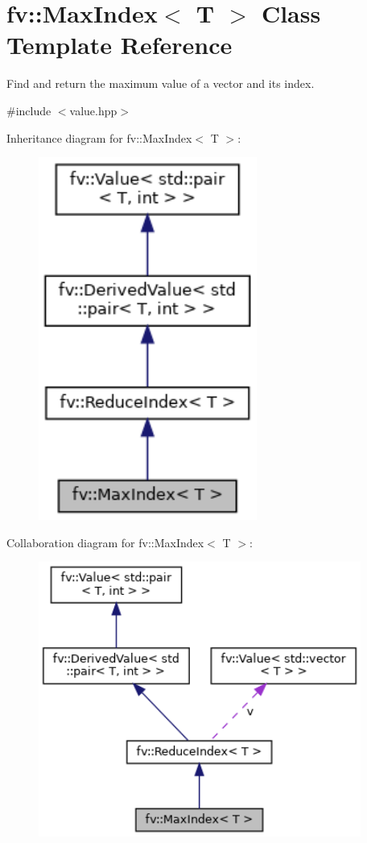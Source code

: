 \hypertarget{classfv_1_1MaxIndex}{}\section{fv\+:\+:Max\+Index$<$ T $>$ Class Template Reference}
\label{classfv_1_1MaxIndex}


Find and return the maximum value of a vector and its index.  




{\ttfamily \#include $<$value.\+hpp$>$}



Inheritance diagram for fv\+:\+:Max\+Index$<$ T $>$\+:
\nopagebreak
\begin{figure}[H]
\begin{center}
\leavevmode
\includegraphics[width=203pt]{classfv_1_1MaxIndex__inherit__graph}
\end{center}
\end{figure}


Collaboration diagram for fv\+:\+:Max\+Index$<$ T $>$\+:
\nopagebreak
\begin{figure}[H]
\begin{center}
\leavevmode
\includegraphics[width=300pt]{classfv_1_1MaxIndex__coll__graph}
\end{center}
\end{figure}
